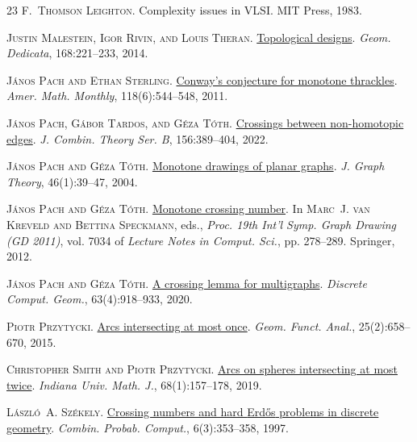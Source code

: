 \documentclass[a4paper,11pt]{article}
\begin{document}
\begin{thebibliography}{23}
	\textsc{F.~Thomson Leighton}.
	\newblock Complexity issues in {VLSI}.
	\newblock MIT Press, 1983.
	
	\textsc{Justin Malestein, Igor Rivin, and Louis Theran}.
	\newblock \href{https://doi.org/10.1007/s10711-012-9827-9}{Topological designs}.
	\newblock \emph{Geom. Dedicata}, 168:221--233, 2014.
	
	\textsc{J\'{a}nos Pach and Ethan Sterling}.
	\newblock \href{https://doi.org/10.4169/amer.math.monthly.118.06.544}{Conway's conjecture for monotone thrackles}.
	\newblock \emph{Amer. Math. Monthly}, 118(6):544--548, 2011.
	
	\textsc{J\'{a}nos Pach, G\'{a}bor Tardos, and G\'{e}za T\'{o}th}.
	\newblock \href{https://doi.org/10.1016/j.jctb.2022.05.007}{Crossings between non-homotopic edges}.
	\newblock \emph{J. Combin. Theory Ser. B}, 156:389--404, 2022.
	
	\textsc{J{\'a}nos Pach and G{\'e}za T{\'o}th}.
	\newblock \href{https://doi.org/10.1002/jgt.10168}{Monotone drawings of planar graphs}.
	\newblock \emph{J. Graph Theory}, 46(1):39--47, 2004.
	
	\textsc{J\'{a}nos Pach and G\'{e}za T\'{o}th}.
	\newblock \href{https://doi.org/10.1007/978-3-642-25878-7\_27}{Monotone crossing number}.
	\newblock In \textsc{Marc~J. van Kreveld and Bettina Speckmann}, eds., \emph{Proc. 19th Int'l Symp. Graph Drawing \textup{({GD} 2011)}}, vol. 7034 of \emph{Lecture Notes in Comput. Sci.}, pp. 278--289. Springer, 2012.
	
	\textsc{J\'{a}nos Pach and G\'{e}za T\'{o}th}.
	\newblock \href{https://doi.org/10.1007/s00454-018-00052-z}{A crossing lemma for multigraphs}.
	\newblock \emph{Discrete Comput. Geom.}, 63(4):918--933, 2020.
	
	\textsc{Piotr Przytycki}.
	\newblock \href{https://doi.org/10.1007/s00039-015-0320-0}{Arcs intersecting at most once}.
	\newblock \emph{Geom. Funct. Anal.}, 25(2):658--670, 2015.
	
	\textsc{Christopher Smith and Piotr Przytycki}.
	\newblock \href{https://doi.org/10.1512/iumj.2019.68.7565}{Arcs on spheres intersecting at most twice}.
	\newblock \emph{Indiana Univ. Math. J.}, 68(1):157--178, 2019.
	
	\textsc{L{\'a}szl{\'o}~A. Sz{\'e}kely}.
	\newblock \href{https://doi.org/10.1017/S0963548397002976}{Crossing numbers and hard {Erd{\H{o}}s} problems in discrete geometry}.
	\newblock \emph{Combin. Probab. Comput.}, 6(3):353--358, 1997.
	
\end{thebibliography}
\end{document}
